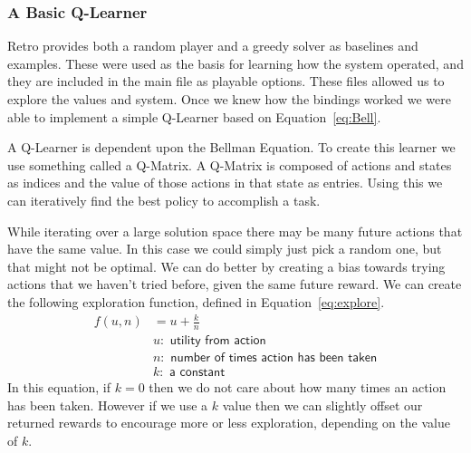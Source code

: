\subsubsection{A Basic Q-Learner}
Retro provides both a random player and a greedy solver as baselines and examples.
These were used as the basis for learning how the system operated, and they are
included in the main file as playable options. These files allowed us to explore
the values and system. Once we knew how the bindings worked we were able to 
implement a simple Q-Learner based on Equation~\ref{eq:Bell}. 

A Q-Learner is dependent upon the Bellman Equation.
To create this learner we use something called a Q-Matrix. A Q-Matrix is composed
of actions and states as indices and the value of those actions in that state
as entries. Using this we can iteratively find the best policy to accomplish
a task.

While iterating over a large solution space there may be many future actions that
have the same value. In this case we could simply just pick a random one, but
that might not be optimal. We can do better by creating a bias towards trying
actions that we haven't tried before, given the same future reward. We can
create the following exploration function, defined in Equation~\ref{eq:explore}.
\begin{align}
    f(u,n) &= u + \frac{k}{n}\label{eq:explore}\\
    & u: \textsf{ utility from action}\nonumber\\
    & n: \textsf{ number of times action has been taken}\nonumber\\
    & k: \textsf{ a constant}\nonumber
\end{align}
In this equation, if $k=0$ then we do not care about how many times an action 
has been taken.  However if we use a $k$ value then we can slightly offset our 
returned rewards to encourage more or less exploration, depending on the 
value of $k$. 


